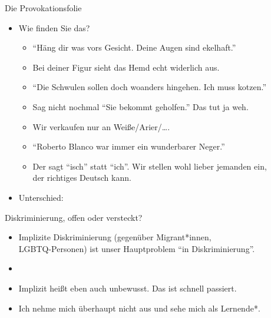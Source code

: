 \begin{frame}
  {Die Provokationsfolie}
  \pause
  \begin{itemize}[<+->]
    \item Wie finden Sie das?
      \Halbzeile
      \begin{itemize}[<+->]
        \item "`Häng dir was vors Gesicht. Deine Augen sind ekelhaft."'
          \Viertelzeile
        \item Bei deiner Figur sieht das Hemd echt widerlich aus.
          \Viertelzeile
        \item "`Die Schwulen sollen doch woanders hingehen. Ich muss kotzen."'
          \Viertelzeile
        \item Sag nicht nochmal "`Sie bekommt geholfen."' Das tut ja weh.
          \Viertelzeile
        \item Wir verkaufen nur an Weiße\slash Arier\slash\ldots.
          \Viertelzeile
        \item "`Roberto Blanco war immer ein wunderbarer Neger."'
          \Viertelzeile
        \item Der sagt "`isch"' statt "`ich"'. Wir stellen wohl lieber jemanden ein,\\
          der richtiges Deutsch kann.
      \end{itemize}
      \Zeile
    \item Unterschied: 
  \end{itemize}
\end{frame}


\begin{frame}
  {Diskriminierung, offen oder versteckt?}
  \pause
  \begin{itemize}[<+->]
    \item Implizite Diskriminierung (\zB gegenüber Migrant*innen,\\
      LGBTQ-Personen) ist unser Hauptproblem "`in Diskriminierung"'.
    \item {}
      \Halbzeile
    \item Implizit heißt eben auch \alert{unbewusst}. Das ist schnell passiert.
      \Halbzeile
    \item Ich nehme mich überhaupt nicht aus und sehe mich als Lernende*.
    \Halbzeile
  \end{itemize}
\end{frame}

